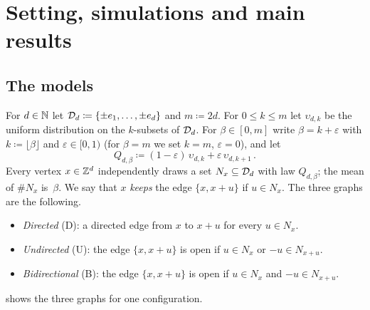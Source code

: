 \documentclass[11pt,letterpaper]{article}
\begin{document}
\section{Setting, simulations and main results}\label{sec:setting}

\subsection{The models}

For $d\in\mathbb N$ let $\mathcal D_d\coloneqq\{\pm e_1,\dots,\pm e_d\}$ and $m\coloneqq2d$. For $0\le k\le m$ let $\upsilon_{d,k}$ be the uniform distribution on the $k$-subsets of $\mathcal D_d$. For $\beta\in[0,m]$ write $\beta=k+\varepsilon$ with $k\coloneqq\lfloor\beta\rfloor$ and $\varepsilon\in[0,1)$ (for $\beta=m$ we set $k=m$, $\varepsilon=0$), and let
\begin{equation*}
Q_{d,\beta}\coloneqq(1-\varepsilon)\,\upsilon_{d,k}+\varepsilon\,\upsilon_{d,k+1}\,.
\end{equation*}
Every vertex $x\in\mathbb Z^d$ independently draws a set $N_x\subseteq\mathcal D_d$ with law $Q_{d,\beta}$; the mean of $\#N_x$ is~$\beta$. We say that $x$ \emph{keeps} the edge $\{x,x+u\}$ if $u\in N_x$. The three graphs are the following.
\begin{itemize}
\item \emph{Directed} (D): a directed edge from $x$ to $x+u$ for every $u\in N_x$.
\item \emph{Undirected} (U): the edge $\{x,x+u\}$ is open if $u\in N_x$ or $-u\in N_{x+u}$.
\item \emph{Bidirectional} (B): the edge $\{x,x+u\}$ is open if $u\in N_x$ and $-u\in N_{x+u}$.
\end{itemize}
 shows the three graphs for one configuration.


\end{document}
